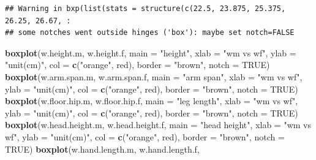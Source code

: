 \documentclass[]{article}
\newenvironment{Shaded}{\begin{snugshade}}{\end{snugshade}}
\newcommand{\DataTypeTok}[1]{\textcolor[rgb]{0.13,0.29,0.53}{#1}}
\newcommand{\KeywordTok}[1]{\textcolor[rgb]{0.13,0.29,0.53}{\textbf{#1}}}
\newcommand{\NormalTok}[1]{#1}
\newcommand{\OtherTok}[1]{\textcolor[rgb]{0.56,0.35,0.01}{#1}}
\newcommand{\StringTok}[1]{\textcolor[rgb]{0.31,0.60,0.02}{#1}}
\begin{document}
\begin{verbatim}
## Warning in bxp(list(stats = structure(c(22.5, 23.875, 25.375, 26.25, 26.67, :
## some notches went outside hinges ('box'): maybe set notch=FALSE
\end{verbatim}

\begin{Shaded}
\begin{Highlighting}[]
\KeywordTok{boxplot}\NormalTok{(w.height.m, w.height.f,}
        \DataTypeTok{main =} \StringTok{"height"}\NormalTok{,}
        \DataTypeTok{xlab =} \StringTok{"wm vs wf"}\NormalTok{,}
        \DataTypeTok{ylab =} \StringTok{"unit(cm)"}\NormalTok{,}
        \DataTypeTok{col =} \KeywordTok{c}\NormalTok{(}\StringTok{"orange"}\NormalTok{, }\StringTok{\textquotesingle{}red\textquotesingle{}}\NormalTok{),}
        \DataTypeTok{border =} \StringTok{"brown"}\NormalTok{,}
        \DataTypeTok{notch =} \OtherTok{TRUE}\NormalTok{)}
\KeywordTok{boxplot}\NormalTok{(w.arm.span.m, w.arm.span.f,}
        \DataTypeTok{main =} \StringTok{"arm span"}\NormalTok{,}
        \DataTypeTok{xlab =} \StringTok{"wm vs wf"}\NormalTok{,}
        \DataTypeTok{ylab =} \StringTok{"unit(cm)"}\NormalTok{,}
        \DataTypeTok{col =} \KeywordTok{c}\NormalTok{(}\StringTok{"orange"}\NormalTok{, }\StringTok{\textquotesingle{}red\textquotesingle{}}\NormalTok{),}
        \DataTypeTok{border =} \StringTok{"brown"}\NormalTok{,}
        \DataTypeTok{notch =} \OtherTok{TRUE}\NormalTok{)}
\KeywordTok{boxplot}\NormalTok{(w.floor.hip.m, w.floor.hip.f, }
        \DataTypeTok{main =} \StringTok{"leg length"}\NormalTok{,}
        \DataTypeTok{xlab =} \StringTok{"wm vs wf"}\NormalTok{,}
        \DataTypeTok{ylab =} \StringTok{"unit(cm)"}\NormalTok{,}
        \DataTypeTok{col =} \KeywordTok{c}\NormalTok{(}\StringTok{"orange"}\NormalTok{, }\StringTok{\textquotesingle{}red\textquotesingle{}}\NormalTok{),}
        \DataTypeTok{border =} \StringTok{"brown"}\NormalTok{,}
        \DataTypeTok{notch =} \OtherTok{TRUE}\NormalTok{)}
\KeywordTok{boxplot}\NormalTok{(w.head.height.m, w.head.height.f,}
        \DataTypeTok{main =} \StringTok{"head height"}\NormalTok{,}
        \DataTypeTok{xlab =} \StringTok{"wm vs wf"}\NormalTok{,}
        \DataTypeTok{ylab =} \StringTok{"unit(cm)"}\NormalTok{,}
        \DataTypeTok{col =} \KeywordTok{c}\NormalTok{(}\StringTok{"orange"}\NormalTok{, }\StringTok{\textquotesingle{}red\textquotesingle{}}\NormalTok{),}
        \DataTypeTok{border =} \StringTok{"brown"}\NormalTok{,}
        \DataTypeTok{notch =} \OtherTok{TRUE}\NormalTok{)}
\KeywordTok{boxplot}\NormalTok{(w.hand.length.m, w.hand.length.f,}

\end{Highlighting}
\end{Shaded}
\end{document}
